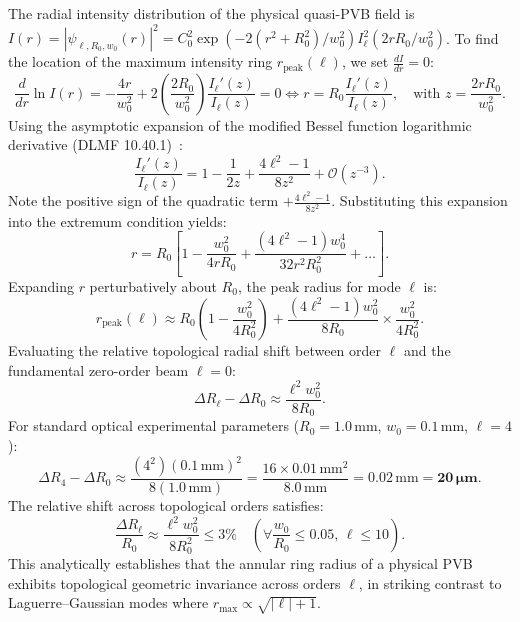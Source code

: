 \documentclass[11pt,a4paper]{article}
\begin{document}
The radial intensity distribution of the physical quasi-PVB field is $I(r) = |\psi_{\ell, R_0, w_0}(r)|^2 = C_0^2 \exp(-2(r^2 + R_0^2)/w_0^2) I_\ell^2(2 r R_0 / w_0^2)$.
To find the location of the maximum intensity ring $r_{\text{peak}}(\ell)$, we set $\frac{d I}{dr} = 0$:
\begin{equation}
\frac{d}{dr} \ln I(r) = -\frac{4r}{w_0^2} + 2 \left( \frac{2 R_0}{w_0^2} \right) \frac{I_\ell'(z)}{I_\ell(z)} = 0 \iff r = R_0 \frac{I_\ell'(z)}{I_\ell(z)}, \quad \text{with } z = \frac{2 r R_0}{w_0^2}.
\label{eq:app_peak_derivative}
\end{equation}
Using the asymptotic expansion of the modified Bessel function logarithmic derivative (DLMF 10.40.1)~\cite{Arfken2012}:
\begin{equation}
\frac{I_\ell'(z)}{I_\ell(z)} = 1 - \frac{1}{2z} + \frac{4\ell^2 - 1}{8 z^2} + \mathcal{O}(z^{-3}).
\label{eq:app_ratio_bessel_deriv}
\end{equation}
Note the positive sign of the quadratic term $+ \frac{4\ell^2 - 1}{8 z^2}$. Substituting this expansion into the extremum condition yields:
\begin{equation}
r = R_0 \left[ 1 - \frac{w_0^2}{4 r R_0} + \frac{(4\ell^2 - 1) w_0^4}{32 r^2 R_0^2} + \dots \right].
\label{eq:app_r_expansion}
\end{equation}
Expanding $r$ perturbatively about $R_0$, the peak radius for mode $\ell$ is:
\begin{equation}
r_{\text{peak}}(\ell) \approx R_0 \left( 1 - \frac{w_0^2}{4 R_0^2} \right) + \frac{(4\ell^2 - 1) w_0^2}{8 R_0} \times \frac{w_0^2}{4 R_0^2}.
\label{eq:app_delta_r_ell}
\end{equation}
Evaluating the relative topological radial shift between order $\ell$ and the fundamental zero-order beam $\ell = 0$:
\begin{equation}
\boxed{\Delta R_\ell - \Delta R_0 \approx \frac{\ell^2 w_0^2}{8 R_0}.}
\label{eq:app_delta_r_final}
\end{equation}
For standard optical experimental parameters ($R_0 = 1.0\,\text{mm}$, $w_0 = 0.1\,\text{mm}$, $\ell = 4$):
\begin{equation}
\Delta R_4 - \Delta R_0 \approx \frac{(4^2)(0.1\,\text{mm})^2}{8(1.0\,\text{mm})} = \frac{16 \times 0.01\,\text{mm}^2}{8.0\,\text{mm}} = 0.02\,\text{mm} = \mathbf{20\,\mu\text{m}}.
\label{eq:app_shift_eval}
\end{equation}
The relative shift across topological orders satisfies:
\begin{equation}
\frac{\Delta R_\ell}{R_0} \approx \frac{\ell^2 w_0^2}{8 R_0^2} \le 3\% \quad \left( \forall \frac{w_0}{R_0} \le 0.05, \, \ell \le 10 \right).
\end{equation}
This analytically establishes that the annular ring radius of a physical PVB exhibits topological geometric invariance across orders $\ell$, in striking contrast to Laguerre--Gaussian modes where $r_{\max} \propto \sqrt{|\ell|+1}$.
\end{document}
